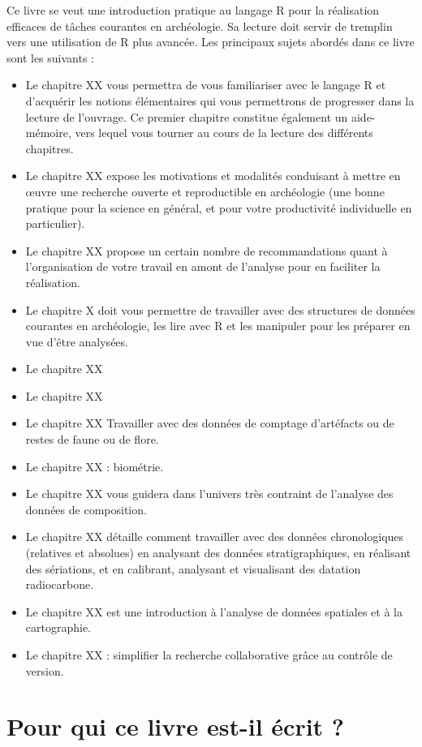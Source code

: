\documentclass[
  french,
]{scrbook}
\providecommand{\tightlist}{%
  \setlength{\itemsep}{0pt}\setlength{\parskip}{0pt}}
\begin{document}
Ce livre se veut une introduction pratique au langage R pour la réalisation efficaces de tâches courantes en archéologie. Sa lecture doit servir de tremplin vers une utilisation de R plus avancée. Les principaux sujets abordés dans ce livre sont les suivants :

\begin{itemize}
\tightlist
\item
  Le chapitre XX vous permettra de vous familiariser avec le langage R et d'acquérir les notions élémentaires qui vous permettrons de progresser dans la lecture de l'ouvrage. Ce premier chapitre constitue également un aide-mémoire, vers lequel vous tourner au cours de la lecture des différents chapitres.
\item
  Le chapitre XX expose les motivations et modalités conduisant à mettre en œuvre une recherche ouverte et reproductible en archéologie (une bonne pratique pour la science en général, et pour votre productivité individuelle en particulier).
\item
  Le chapitre XX propose un certain nombre de recommandations quant à l'organisation de votre travail en amont de l'analyse pour en faciliter la réalisation.
\item
  Le chapitre X doit vous permettre de travailler avec des structures de données courantes en archéologie, les lire avec R et les manipuler pour les préparer en vue d'être analysées.
\item
  Le chapitre XX
\item
  Le chapitre XX
\item
  Le chapitre XX Travailler avec des données de comptage d'artéfacts ou de restes de faune ou de flore.
\item
  Le chapitre XX : biométrie.
\item
  Le chapitre XX vous guidera dans l'univers très contraint de l'analyse des données de composition.
\item
  Le chapitre XX détaille comment travailler avec des données chronologiques (relatives et absolues) en analysant des données stratigraphiques, en réalisant des sériations, et en calibrant, analysant et visualisant des datation radiocarbone.
\item
  Le chapitre XX est une introduction à l'analyse de données spatiales et à la cartographie.
\item
  Le chapitre XX : simplifier la recherche collaborative grâce au contrôle de version.
\end{itemize}

\hypertarget{pour-qui-ce-livre-est-il-uxe9crit}{%
\section*{Pour qui ce livre est-il écrit ?}\label{pour-qui-ce-livre-est-il-uxe9crit}}
\end{document}
